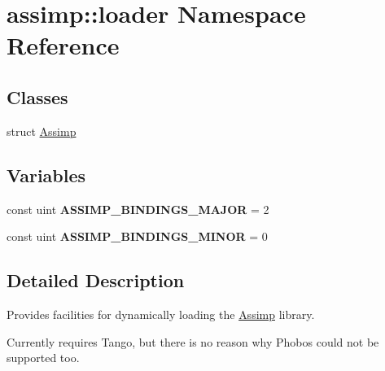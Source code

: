 \hypertarget{namespaceassimp_1_1loader}{\section{assimp\+:\+:loader Namespace Reference}
\label{namespaceassimp_1_1loader}
}
\subsection*{Classes}
\begin{DoxyCompactItemize}
\item 
struct \hyperlink{structassimp_1_1loader_1_1_assimp}{Assimp}
\end{DoxyCompactItemize}
\subsection*{Variables}
\begin{DoxyCompactItemize}
\item 
\hypertarget{namespaceassimp_1_1loader_a61e385611d7012044e9bb9d50d30c37f}{const uint {\bfseries A\+S\+S\+I\+M\+P\+\_\+\+B\+I\+N\+D\+I\+N\+G\+S\+\_\+\+M\+A\+J\+O\+R} = 2}\label{namespaceassimp_1_1loader_a61e385611d7012044e9bb9d50d30c37f}

\item 
\hypertarget{namespaceassimp_1_1loader_a732752a7956061b4cbbe855ef6d4f5af}{const uint {\bfseries A\+S\+S\+I\+M\+P\+\_\+\+B\+I\+N\+D\+I\+N\+G\+S\+\_\+\+M\+I\+N\+O\+R} = 0}\label{namespaceassimp_1_1loader_a732752a7956061b4cbbe855ef6d4f5af}

\end{DoxyCompactItemize}


\subsection{Detailed Description}
Provides facilities for dynamically loading the \hyperlink{structassimp_1_1loader_1_1_assimp}{Assimp} library.

Currently requires Tango, but there is no reason why Phobos could not be supported too. 